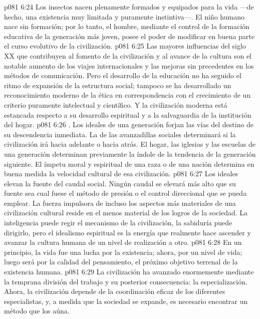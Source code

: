 \vs p081 6:24 Los insectos nacen plenamente formados y equipados para la vida ---de hecho, una existencia muy limitada y puramente instintiva---. El niño humano nace sin formación; por lo tanto, el hombre, mediante el control de la formación educativa de la generación más joven, posee el poder de modificar en buena parte el curso evolutivo de la civilización.
\vs p081 6:25 Las mayores influencias del siglo XX que contribuyen al fomento de la civilización y al avance de la cultura son el notable aumento de los viajes internacionales y las mejoras sin precedentes en los métodos de comunicación. Pero el desarrollo de la educación no ha seguido el ritmo de expansión de la estructura social; tampoco se ha desarrollado un reconocimiento moderno de la ética en correspondencia con el crecimiento de un criterio puramente intelectual y científico. Y la civilización moderna está estancada respecto a su desarrollo espiritual y a la salvaguardia de la institución del hogar.
\vs p081 6:26 . Los ideales de una generación forjan las vías del destino de su descendencia inmediata. La  de las avanzadillas sociales determinará si la civilización irá hacia adelante o hacia atrás. El hogar, las iglesias y las escuelas de una generación determinan previamente la índole de la tendencia de la generación siguiente. El ímpetu moral y espiritual de una raza o de una nación determina en buena medida la velocidad cultural de esa civilización.
\vs p081 6:27 Los ideales elevan la fuente del caudal social. Ningún caudal se elevará más alto que su fuente sea cual fuese el método de presión o el control direccional que se pueda emplear. La fuerza impulsora de incluso los aspectos más materiales de una civilización cultural reside en el menos material de los logros de la sociedad. La inteligencia puede regir el mecanismo de la civilización, la sabiduría puede dirigirlo, pero el idealismo espiritual es la energía que realmente hace ascender y avanzar la cultura humana de un nivel de realización a otro.
\vs p081 6:28 En un principio, la vida fue una lucha por la existencia; ahora, por un nivel de vida; luego será por la calidad del pensamiento, el próximo objetivo terrenal de la existencia humana.
\vs p081 6:29  La civilización ha avanzado enormemente mediante la temprana división del trabajo y su posterior consecuencia: la especialización. Ahora, la civilización depende de la coordinación eficaz de los diferentes especialistas, y, a medida que la sociedad se expande, es necesario encontrar un método que los aúna.
